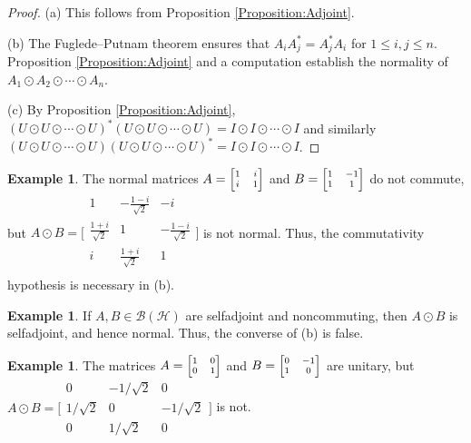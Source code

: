 \documentclass[10pt,reqno]{amsart}
\newcommand{\0}{{\color{lightgray}0}}
\newcommand{\B}{\mathcal{B}}
\renewcommand{\leq}{\leqslant}
\newcommand{\h}{\mathcal{H}}
\newcommand{\minimatrix}[4]{\begin{bmatrix} #1 & #2 \\ #3 & #4 \end{bmatrix}  }
\theoremstyle{definition}
\newtheorem{Example}[equation]{Example}
\numberwithin{equation}{section}
\begin{document}
\begin{proof}
(a) This follows from Proposition \ref{Proposition:Adjoint}.

\medskip\noindent(b) The Fuglede--Putnam theorem \cite{FPthm} ensures that $A_i A_j^* = A_j^* A_i$ for $1\leq i,j\leq n$.  Proposition \ref{Proposition:Adjoint} and a computation establish the normality of 
$A_1 \odot A_2 \odot \cdots \odot A_n$.

\medskip\noindent(c) By Proposition \ref{Proposition:Adjoint},
$(U \odot U \odot \cdots \odot U)^* (U \odot U \odot \cdots \odot U) = I \odot I \odot \cdots \odot I$ and similarly $(U \odot U \odot \cdots \odot U) (U \odot U \odot \cdots \odot U)^*   = I \odot I \odot \cdots \odot I$.
\end{proof}

\begin{Example}
The normal matrices $A = \scriptsize \minimatrix{1}{i}{i}{1}$ and $B = \scriptsize \minimatrix{1}{-1}{1}{1}$ do not commute, but
$
A \odot B =
\Bigg[
\begin{smallmatrix}
 1 & -\frac{1-i}{\sqrt{2}} & -i \\
 \frac{1+i}{\sqrt{2}} & 1 &
   -\frac{1-i}{\sqrt{2}} \\
 i & \frac{1+i}{\sqrt{2}} & 1 \\
\end{smallmatrix}\Bigg]$
is not normal.  Thus, the commutativity hypothesis is necessary in (b).
\end{Example}

\begin{Example}
If $A,B \in \B(\h)$ are selfadjoint and noncommuting, then $A \odot B$ is selfadjoint, and hence normal.
Thus, the converse of (b) is false.
\end{Example}



\begin{Example}
The matrices $A = \scriptsize \minimatrix{1}{0}{0}{1}$ and $B = \scriptsize \minimatrix{0}{-1}{1}{0}$ are unitary, but
$A\odot B= \Bigg[\begin{smallmatrix}
0 & -1/\sqrt{2} &0\\
1/\sqrt{2} & 0 & -1/\sqrt{2}\\
0 & 1/\sqrt{2} &0
\end{smallmatrix}\Bigg]$ is not.
\end{Example}
\end{document}
